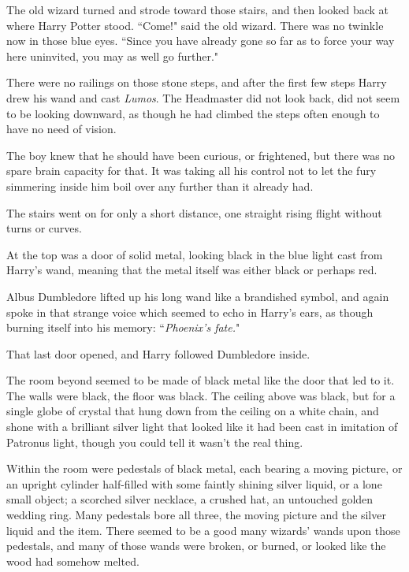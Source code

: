 The old wizard turned and strode toward those stairs, and then looked back at where Harry Potter stood. ``Come!" said the old wizard. There was no twinkle now in those blue eyes. ``Since you have already gone so far as to force your way here uninvited, you may as well go further."

\later

There were no railings on those stone steps, and after the first few steps Harry drew his wand and cast \emph{Lumos}. The Headmaster did not look back, did not seem to be looking downward, as though he had climbed the steps often enough to have no need of vision.

The boy knew that he should have been curious, or frightened, but there was no spare brain capacity for that. It was taking all his control not to let the fury simmering inside him boil over any further than it already had.

The stairs went on for only a short distance, one straight rising flight without turns or curves.

At the top was a door of solid metal, looking black in the blue light cast from Harry's wand, meaning that the metal itself was either black or perhaps red.

Albus Dumbledore lifted up his long wand like a brandished symbol, and again spoke in that strange voice which seemed to echo in Harry's ears, as though burning itself into his memory: ``\emph{Phoenix's fate.}"

That last door opened, and Harry followed Dumbledore inside.

The room beyond seemed to be made of black metal like the door that led to it. The walls were black, the floor was black. The ceiling above was black, but for a single globe of crystal that hung down from the ceiling on a white chain, and shone with a brilliant silver light that looked like it had been cast in imitation of Patronus light, though you could tell it wasn't the real thing.

Within the room were pedestals of black metal, each bearing a moving picture, or an upright cylinder half-filled with some faintly shining silver liquid, or a lone small object; a scorched silver necklace, a crushed hat, an untouched golden wedding ring. Many pedestals bore all three, the moving picture and the silver liquid and the item. There seemed to be a good many wizards' wands upon those pedestals, and many of those wands were broken, or burned, or looked like the wood had somehow melted.

